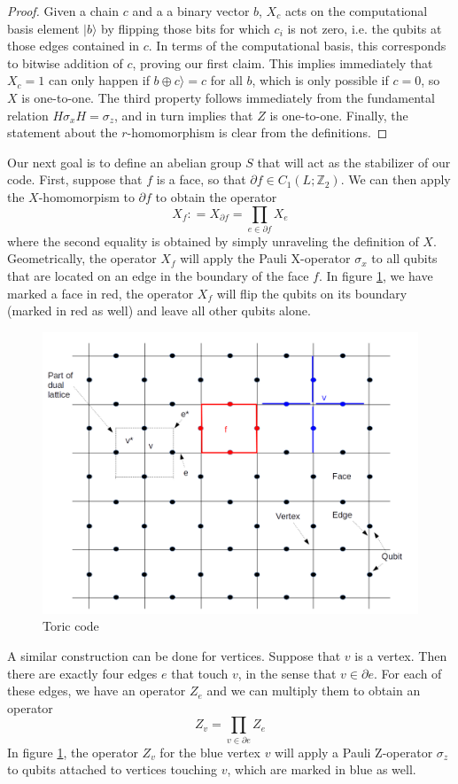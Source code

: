 \documentclass[a4paper, draft]{article}
\theoremstyle{own}
\theoremstyle{remark}
\newcommand{\Z}{\mathbb{Z}}
\begin{document}
\begin{proof}
Given a chain $c$ and a a binary vector $b$, $X_c$ acts on the computational basis element $|b \rangle$ by flipping those bits for which $c_i$ is not zero, i.e. the qubits at those edges contained in $c$. In terms of the computational basis, this corresponds to bitwise addition of $c$, proving our first claim. This implies immediately that $X_c = 1$ can only happen if $b \oplus c \rangle  = c$ for all $b$, which is only possible if $c=0$, so $X$ is one-to-one. The third property follows immediately from the fundamental relation $H \sigma_x H = \sigma_z$, and in turn implies that $Z$ is one-to-one. Finally, the statement about the $r$-homomorphism is clear from the definitions.
\end{proof}

Our next goal is to define an abelian group $S$ that will act as the stabilizer of our code. First, suppose that $f$ is a face, so that $\partial f \in C_1(L;\Z_2)$. We can then apply the $X$-homomorpism to $\partial f$ to obtain the operator 
$$
X_f \colon = X_{\partial f} = \prod_{e \in \partial f} X_e
$$
where the second equality is obtained by simply unraveling the definition of $X$. Geometrically, the operator $X_f$ will apply the Pauli X-operator $\sigma_x$ to all qubits that are located on an edge in the boundary of the face $f$. In figure \ref{fig:ToricCode}, we have marked a face in red, the operator $X_f$ will flip the qubits on its boundary (marked in red as well) and leave all other qubits alone.



\begin{figure}[ht]
\centering
\includegraphics[width=0.7\linewidth]{images/ToricCode}
\caption[Toric code]{Toric code}
\label{fig:ToricCode}
\end{figure}

A similar construction can be done for vertices. Suppose that $v$ is a vertex. Then there are exactly four edges $e$ that touch $v$, in the sense that $v \in \partial e$. For each of these edges, we have an operator $Z_e$ and we can multiply them to obtain an operator
$$
Z_v = \prod_{v \in \partial e} Z_e
$$
In figure \ref{fig:ToricCode}, the operator $Z_v$ for the blue vertex $v$ will apply a Pauli Z-operator $\sigma_z$ to qubits attached to vertices touching $v$, which are marked in blue as well.
\end{document}
